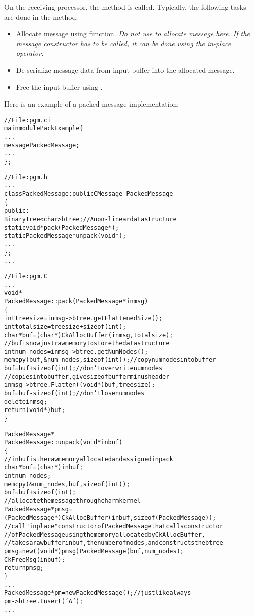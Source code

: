 On the receiving processor, the  method is called. Typically, the
following tasks are done in the  method:

\begin{itemize}

\item Allocate message using  function. {\em Do not
use  to allocate message here. If the message constructor has
to be called, it can be done using the in-place  operator.}

\item De-serialize message data from input buffer into the allocated message.

\item Free the input buffer using .

\end{itemize}

Here is an example of a packed-message implementation:

\begin{alltt}
// File: pgm.ci
mainmodule PackExample \{
  ...
  message PackedMessage;
  ...
\};

// File: pgm.h
...
class PackedMessage : public CMessage_PackedMessage
\{
  public:
    BinaryTree<char> btree; // A non-linear data structure 
    static void* pack(PackedMessage*);
    static PackedMessage* unpack(void*);
    ...
\};
...

// File: pgm.C
...
void*
PackedMessage::pack(PackedMessage* inmsg)
\{
  int treesize = inmsg->btree.getFlattenedSize();
  int totalsize = treesize + sizeof(int);
  char *buf = (char*)CkAllocBuffer(inmsg, totalsize);
  // buf is now just raw memory to store the data structure
  int num_nodes = inmsg->btree.getNumNodes();
  memcpy(buf, &num_nodes, sizeof(int));  // copy numnodes into buffer
  buf = buf + sizeof(int);               // don't overwrite numnodes
  // copies into buffer, give size of buffer minus header
  inmsg->btree.Flatten((void*)buf, treesize);    
  buf = buf - sizeof(int);              // don't lose numnodes
  delete inmsg;
  return (void*) buf;
\}

PackedMessage*
PackedMessage::unpack(void* inbuf)
\{
  // inbuf is the raw memory allocated and assigned in pack
  char* buf = (char*) inbuf;
  int num_nodes;
  memcpy(&num_nodes, buf, sizeof(int));
  buf = buf + sizeof(int);
  // allocate the message through charm kernel
  PackedMessage* pmsg = 
    (PackedMessage*)CkAllocBuffer(inbuf, sizeof(PackedMessage));
  // call "inplace" constructor of PackedMessage that calls constructor
  // of PackedMessage using the memory allocated by CkAllocBuffer,
  // takes a raw buffer inbuf, the number of nodes, and constructs the btree
  pmsg = new ((void*)pmsg) PackedMessage(buf, num_nodes);  
  CkFreeMsg(inbuf);
  return pmsg;
\}
... 
PackedMessage* pm = new PackedMessage();  // just like always 
pm->btree.Insert('A');
...
\end{alltt}


